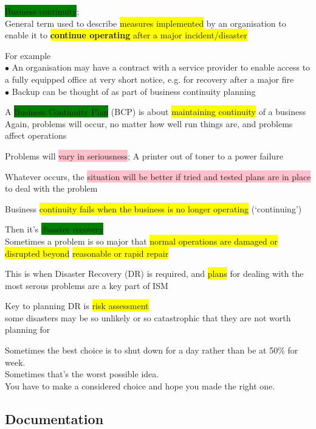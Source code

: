\documentclass[tikz,border=10pt]{project_plan}
\newcommand{\bulletPoint}{\hspace{-3.1pt}$\bullet$ \hspace{5pt}}
\begin{document}
\colorbox{green}{Business continuity};\\
General term used to describe \colorbox{yellow}{measures implemented} by an organisation to enable
it to \colorbox{yellow}{\textbf{continue operating} after a major incident/disaster}

For example\\
\bulletPoint An organisation may have a contract with a service provider to enable access to
a fully equipped office at very short notice, e.g. for recovery after a major fire\\
\bulletPoint Backup can be thought of as part of business continuity planning

A \colorbox{green}{Business Continuity Plan} (BCP) is about \colorbox{yellow}{maintaining continuity} of a business\\
Again, problems will occur, no matter how well run things are, and problems affect
operations

Problems will \colorbox{pink}{vary in seriousness}; A printer out of toner to a power failure

Whatever occurs, the \colorbox{pink}{situation will be better if tried and tested plans are in
  place} to deal with the problem

Business \colorbox{yellow}{continuity fails when the business is no longer operating} (‘continuing’)

Then it’s \colorbox{green}{disaster recovery}\\
Sometimes a problem is so major that \colorbox{yellow}{normal operations are damaged or disrupted
  beyond} \colorbox{yellow}{reasonable or rapid repair}

This is when Disaster Recovery (DR) is required, and \colorbox{yellow}{plans} for dealing with
the most serous problems are a key part of ISM

Key to planning DR is \colorbox{yellow}{risk assessment}\\
some disasters may be so unlikely or so catastrophic that they are not worth
planning for

Sometimes the best choice is to shut down for a day rather than be at 50\% for week.\\
Sometimes that’s the worst possible idea.\\
You have to make a considered choice and hope you made the right one.
\newpage
\subsection{Documentation}
\end{document}
